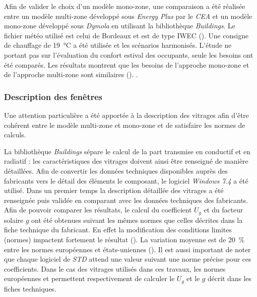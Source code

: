 Afin de valider le choix d’un modèle mono-zone, une comparaison a été réalisée
entre un modèle multi-zone développé sous \textit{Energy Plus} par le
\textit{CEA} et un modèle mono-zone développé sous \textit{Dymola} en utilisant
la bibliothèque \textit{Buildings}. Le fichier météo utilisé est celui de
Bordeaux et est de type IWEC (). Une
consigne de chauffage de \SI{19}{\celsius} a été utilisée et les scénarios
harmonisés. L’étude ne portant pas sur l’évaluation du confort estival des
occupants, seule les besoins ont été comparés. Les résultats montrent que les
besoins de l’approche mono-zone et de l’approche multi-zone sont similaires
().
.


\subsubsection{Description des fenêtres} %
\label{ssub:description_des_fenetres}
Une attention particulière a été apportée à la description des vitrages afin
d’être cohérent entre le modèle multi-zone et mono-zone et de satisfaire les normes
de calculs.

La bibliothèque \textit{Buildings} sépare le calcul de la part transmise en
conductif et en radiatif : les caractéristiques des vitrages doivent ainsi être
renseigné de manière détaillées. Afin de convertir les données techniques
disponibles auprès des fabricants vers le détail des éléments le composant, le
logiciel \textit{Windows 7.4} a été utilisé. Dans un premier temps la
description détaillée des vitrages a été renseignée puis validée en comparant
avec les données techniques des fabricants. Afin de pouvoir comparer les
résultats, le calcul du coefficient $U_{g}$ et du facteur solaire $g$ ont été
obtenues suivant les mêmes normes que celles décrites dans la fiche technique du
fabricant. En effet la modification des conditions limites (normes) impactent
fortement le résultat (). La variation moyenne est de
\SI{20}{\percent} entre les normes européennes et états-uniennes (). Il est aussi important de noter que chaque logiciel de \emph{STD} attend
une valeur suivant une norme précise pour ces coefficients. Dans le cas des
vitrages utilisés dans ces travaux, les normes européennes
 et  permettent respectivement
de calculer le $U_{g}$ et le $g$ décrit dans les fiches techniques.

